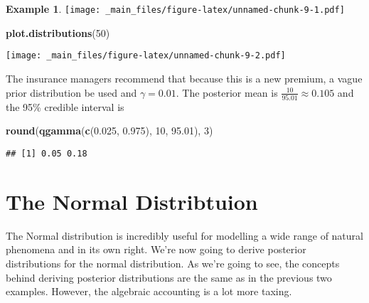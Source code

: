 \documentclass[
]{book}
\newenvironment{Shaded}{\begin{snugshade}}{\end{snugshade}}
\newcommand{\DecValTok}[1]{\textcolor[rgb]{0.00,0.00,0.81}{#1}}
\newcommand{\FloatTok}[1]{\textcolor[rgb]{0.00,0.00,0.81}{#1}}
\newcommand{\FunctionTok}[1]{\textcolor[rgb]{0.13,0.29,0.53}{\textbf{#1}}}
\newcommand{\NormalTok}[1]{#1}
\theoremstyle{definition}
\theoremstyle{definition}
\newtheorem{example}{Example}[chapter]
\theoremstyle{definition}
\theoremstyle{definition}
\theoremstyle{remark}
\begin{document}
\begin{example}
\texttt{[image: \_main\_files/figure-latex/unnamed-chunk-9-1.pdf]}

\begin{Shaded}
\begin{Highlighting}[]
\FunctionTok{plot.distributions}\NormalTok{(}\DecValTok{50}\NormalTok{)}
\end{Highlighting}
\end{Shaded}

\texttt{[image: \_main\_files/figure-latex/unnamed-chunk-9-2.pdf]}

The insurance managers recommend that because this is a new premium, a vague prior distribution be used and \(\gamma = 0.01\). The posterior mean is \(\frac{10}{95.01} \approx 0.105\) and the 95\% credible interval is

\begin{Shaded}
\begin{Highlighting}[]
\FunctionTok{round}\NormalTok{(}\FunctionTok{qgamma}\NormalTok{(}\FunctionTok{c}\NormalTok{(}\FloatTok{0.025}\NormalTok{, }\FloatTok{0.975}\NormalTok{), }\DecValTok{10}\NormalTok{, }\FloatTok{95.01}\NormalTok{), }\DecValTok{3}\NormalTok{)}
\end{Highlighting}
\end{Shaded}

\begin{verbatim}
## [1] 0.05 0.18
\end{verbatim}

\end{example}

\hypertarget{the-normal-distribtuion}{%
\section{The Normal Distribtuion}\label{the-normal-distribtuion}}

The Normal distribution is incredibly useful for modelling a wide range of natural phenomena and in its own right. We're now going to derive posterior distributions for the normal distribution. As we're going to see, the concepts behind deriving posterior distributions are the same as in the previous two examples. However, the algebraic accounting is a lot more taxing.
\end{document}
